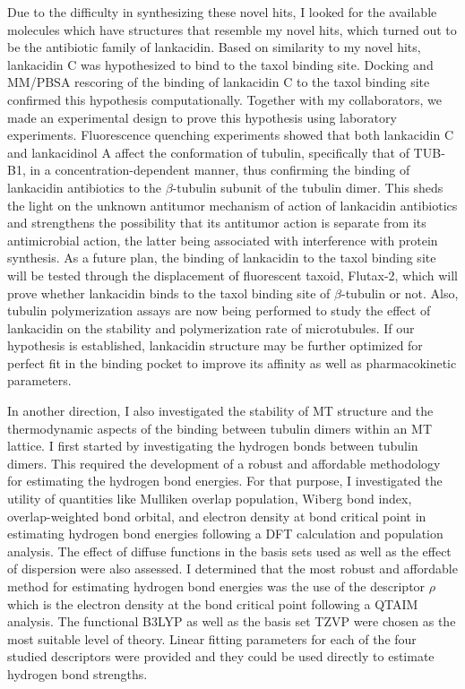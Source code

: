 \documentclass[11pt]{report}
\begin{document}
Due to the difficulty in synthesizing these novel hits, I looked for the available 
molecules which have structures that resemble my novel hits, which turned out
to be the antibiotic family of lankacidin. Based on similarity to my novel hits,
lankacidin C was hypothesized to bind to the taxol binding site. Docking
and MM/PBSA rescoring of the binding of lankacidin C to the taxol binding site
confirmed this hypothesis computationally. Together with my collaborators, we made
an experimental design to prove this hypothesis using laboratory experiments. 
Fluorescence quenching experiments showed that both lankacidin C and lankacidinol 
A affect the conformation of tubulin, specifically that of TUB-B1,
in a concentration-dependent manner, thus confirming the binding of lankacidin
antibiotics to the $\beta$-tubulin subunit of the tubulin dimer.
This sheds the light on the unknown antitumor mechanism of action of lankacidin
antibiotics and strengthens the possibility that its antitumor action is separate
from its antimicrobial action, the latter being associated with
interference with protein synthesis. As a future plan, the binding of lankacidin
to the taxol binding site will be tested through the displacement of
fluorescent taxoid, Flutax-2, which will prove whether lankacidin binds to the
taxol binding site of $\beta$-tubulin or not. Also, tubulin polymerization
assays are now being performed to study the effect of lankacidin on the
stability and polymerization rate of microtubules. If our hypothesis is
established, lankacidin structure may be further optimized for perfect fit in the binding
pocket to improve its affinity as well as pharmacokinetic parameters.

In another direction, I also investigated the stability of MT structure and
the thermodynamic aspects of the binding between tubulin dimers
within an MT lattice. I first started by investigating the hydrogen bonds
between tubulin dimers. This required the development of a robust and affordable
methodology for estimating the hydrogen bond energies. For that purpose, I 
investigated the utility of quantities like Mulliken overlap population,
Wiberg bond index, overlap-weighted bond orbital, and electron density at bond critical point in estimating hydrogen bond energies following a DFT 
calculation and population analysis. The effect of diffuse functions in 
the basis sets used as well as the effect of dispersion were also assessed.
I determined that the most robust and
affordable method for estimating hydrogen bond energies was the 
use of the descriptor $\rho$ which is the electron density at the 
bond critical point following a QTAIM analysis. The functional B3LYP as
well as the basis set TZVP were chosen as the most suitable
level of theory. Linear fitting parameters for each of the four studied descriptors were provided and they could be used directly to estimate hydrogen
bond strengths.
\end{document}
